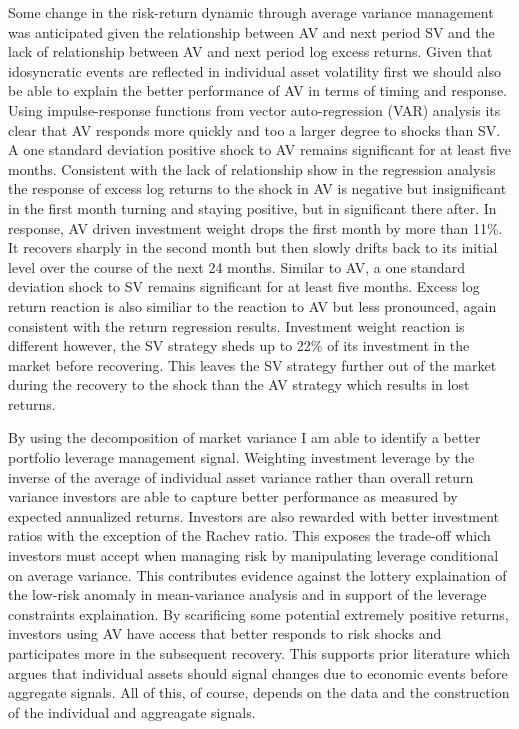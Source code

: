 Some change in the risk-return dynamic through average variance management was anticipated given the relationship between AV and next period SV and the lack of relationship between AV and next period log excess returns. Given that idosyncratic events are reflected in individual asset volatility first we should also be able to explain the better performance of AV in terms of timing and response. Using impulse-response functions from vector auto-regression (VAR) analysis its clear that AV responds more quickly and too a larger degree to shocks than SV. A one standard deviation positive shock to AV remains significant for at least five months. Consistent with the lack of relationship show in the regression analysis the response of excess log returns to the shock in AV is negative but insignificant in the first month turning and staying positive, but in significant there after. In response, AV driven investment weight drops the first month by more than 11\%. It recovers sharply in the second month but then slowly drifts back to its initial level over the course of the next 24 months. Similar to AV, a one standard deviation shock to SV remains significant for at least five months. Excess log return reaction is also similiar to the reaction to AV but less pronounced, again consistent with the return regression results. Investment weight reaction is different however, the SV strategy sheds up to 22\% of its investment in the market before recovering. This leaves the SV strategy further out of the market during the recovery to the shock than the AV strategy which results in lost returns.

By using the decomposition of market variance I am able to identify a better portfolio leverage management signal. Weighting investment leverage by the inverse of the average of individual asset variance rather than overall return variance investors are able to capture better performance as measured by expected annualized returns. Investors are also rewarded with better investment ratios with the exception of the Rachev ratio. This exposes the trade-off which investors must accept when managing risk by manipulating leverage conditional on average variance. This contributes evidence against the lottery explaination of the low-risk anomaly in mean-variance analysis and in support of the leverage constraints explaination. By scarificing some potential extremely positive returns, investors using AV have access that better responds to risk shocks and participates more in the subsequent recovery. This supports prior literature which argues that individual assets should signal changes due to economic events before aggregate signals. All of this, of course, depends on the data and the construction of the individual and aggreagate signals.